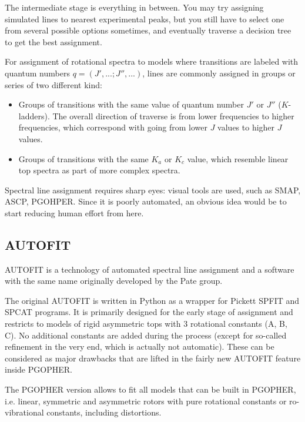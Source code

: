 \documentclass[11pt]{article}
\begin{document}
The intermediate stage is everything in between. You may try assigning simulated lines to nearest experimental peaks, but you still have to select one from several possible options sometimes, and eventually traverse a decision tree to get the best assignment.

For assignment of rotational spectra to models where transitions are labeled with quantum numbers $q = (J', ...; J'', ...)$, lines are commonly assigned in groups or series of two different kind:
\begin{itemize}
	\item Groups of transitions with the same value of quantum number $J'$ or $J''$ ($K$-ladders). 
The overall direction of traverse is from lower frequencies to higher frequencies, which correspond with going from lower $J$ values to higher $J$ values.  
	\item Groups of transitions with the same $K_a$ or $K_c$ value, which resemble linear top spectra as part of more complex spectra.
\end{itemize}

Spectral line assignment requires sharp eyes: visual tools are used, such as SMAP, ASCP, PGOHPER. Since it is poorly automated, an obvious idea would be to start reducing human effort from here.

\subsection{AUTOFIT}

AUTOFIT is a technology of automated spectral line assignment and a software with the same name originally developed by the Pate group. 

The original AUTOFIT is written in Python as a wrapper for Pickett SPFIT and SPCAT programs. It is primarily designed for the early stage of assignment and restricts to models of rigid asymmetric tops with 3 rotational constants (A, B, C).  No additional constants are added during the process (except for so-called refinement in the very end, which is actually not automatic). These can be considered as major drawbacks that are lifted in the fairly new AUTOFIT feature inside PGOPHER. 

The PGOPHER version allows to fit all models that can be built in PGOPHER, i.e. linear, symmetric and asymmetric rotors with pure rotational constants  or ro-vibrational constants, including distortions.
\end{document}

